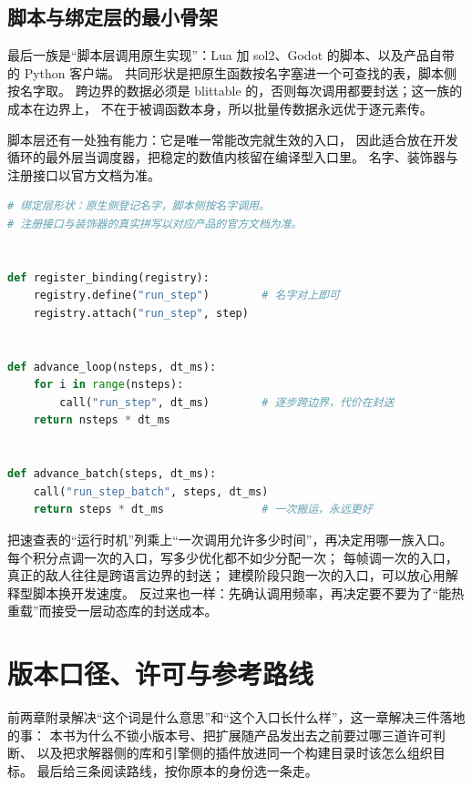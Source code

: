 \documentclass[12pt,a4paper,fontset=fandol]{ctexbook}
\begin{document}
\section{脚本与绑定层的最小骨架}

最后一族是``脚本层调用原生实现''：Lua 加 sol2、Godot 的脚本、以及产品自带的 Python 客户端。
共同形状是把原生函数按名字塞进一个可查找的表，脚本侧按名字取。
跨边界的数据必须是 blittable 的，否则每次调用都要封送；这一族的成本在边界上，
不在于被调函数本身，所以批量传数据永远优于逐元素传。

脚本层还有一处独有能力：它是唯一常能改完就生效的入口，
因此适合放在开发循环的最外层当调度器，把稳定的数值内核留在编译型入口里。
名字、装饰器与注册接口以官方文档为准。

\begin{lstlisting}[language=Python, style=pythonstyle, caption={脚本绑定层的最小形状：注册、按名调用、批量搬运}, label={lst:apB-binding-shape}]
# 绑定层形状：原生侧登记名字，脚本侧按名字调用。
# 注册接口与装饰器的真实拼写以对应产品的官方文档为准。


def register_binding(registry):
    registry.define("run_step")        # 名字对上即可
    registry.attach("run_step", step)


def advance_loop(nsteps, dt_ms):
    for i in range(nsteps):
        call("run_step", dt_ms)        # 逐步跨边界，代价在封送
    return nsteps * dt_ms


def advance_batch(steps, dt_ms):
    call("run_step_batch", steps, dt_ms)
    return steps * dt_ms               # 一次搬运，永远更好
\end{lstlisting}

\begin{bestpractice}[title={选入口之前先量一次调用频率}]
把速查表的``运行时机''列乘上``一次调用允许多少时间''，再决定用哪一族入口。
每个积分点调一次的入口，写多少优化都不如少分配一次；
每帧调一次的入口，真正的敌人往往是跨语言边界的封送；
建模阶段只跑一次的入口，可以放心用解释型脚本换开发速度。
反过来也一样：先确认调用频率，再决定要不要为了``能热重载''而接受一层动态库的封送成本。
\end{bestpractice}

\chapter{版本口径、许可与参考路线}
\label{ch:apC-versions}

前两章附录解决``这个词是什么意思''和``这个入口长什么样''，这一章解决三件落地的事：
本书为什么不锁小版本号、把扩展随产品发出去之前要过哪三道许可判断、
以及把求解器侧的库和引擎侧的插件放进同一个构建目录时该怎么组织目标。
最后给三条阅读路线，按你原本的身份选一条走。
\end{document}
